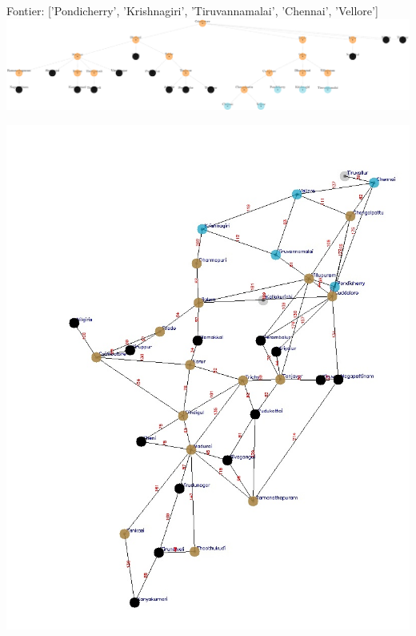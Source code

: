 \documentclass[xcolor=table]{beamer}
\begin{document}
\begin{frame}
  { \tiny Fontier: ['Pondicherry', 'Krishnagiri', 'Tiruvannamalai', 'Chennai', 'Vellore']}
  \includegraphics[width=1\textwidth]{../BFSNodes/43-1.png}
  \begin{center}
    \includegraphics[height=0.6\textheight]{../BFSoutput/tamilBFS41.jpg}
  \end{center}
\end{frame}
\end{document}
